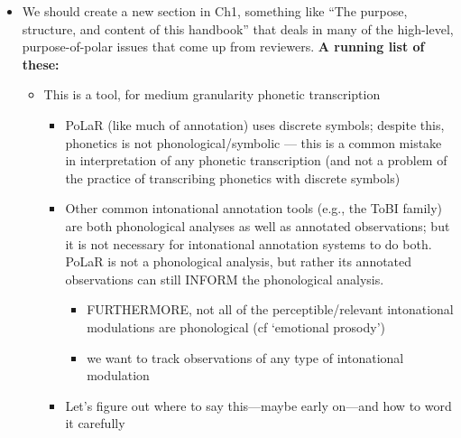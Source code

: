 \documentclass[11pt, twoside]{memoir}
\begin{document}
\begin{itemize}
\tightlist
\item
  We should create a new section in Ch1, something like ``The purpose,
  structure, and content of this handbook'' that deals in many of the
  high-level, purpose-of-polar issues that come up from reviewers.
  \textbf{A running list of these:}

  \begin{itemize}
  \tightlist
  \item
    This is a tool, for medium granularity phonetic transcription

    \begin{itemize}
    \tightlist
    \item
      PoLaR (like much of annotation) uses discrete symbols; despite
      this, phonetics is not phonological/symbolic --- this is a common
      mistake in interpretation of any phonetic transcription (and not a
      problem of the practice of transcribing phonetics with discrete
      symbols)\\
    \item
      Other common intonational annotation tools (e.g., the ToBI family)
      are both phonological analyses as well as annotated observations;
      but it is not necessary for intonational annotation systems to do
      both. PoLaR is not a phonological analysis, but rather its
      annotated observations can still INFORM the phonological analysis.

      \begin{itemize}
      \tightlist
      \item
        FURTHERMORE, not all of the perceptible/relevant intonational
        modulations are phonological (cf `emotional prosody')\\
      \item
        we want to track observations of any type of intonational
        modulation\\
      \end{itemize}
    \item
      Let's figure out where to say this---maybe early on---and how to
      word it carefully


\end{itemize}
\end{itemize}
\end{itemize}
\end{document}
